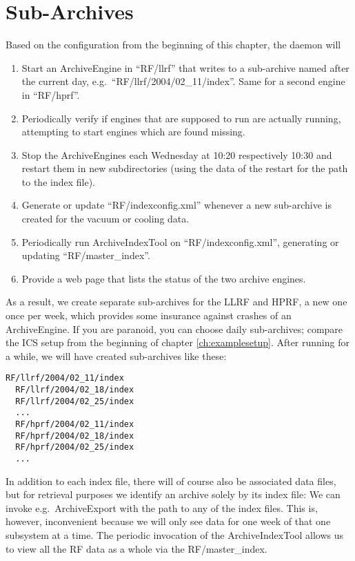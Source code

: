 \section{Sub-Archives}
Based on the configuration from the beginning of this chapter,
the daemon will 
\begin{enumerate}
\item Start an ArchiveEngine in ``RF/llrf'' that writes to
      a sub-archive named after the current day,
      e.g.\ ``RF/llrf/2004/02\_11/index''.
      Same for a second engine in ``RF/hprf''.
\item Periodically verify if engines that are supposed to run are
      actually running, attempting to start engines which are found missing.
\item Stop the ArchiveEngines each Wednesday at 10:20 respectively
      10:30 and restart them in new subdirectories
      (using the data of the restart for the path to the index file).  
\item Generate or update ``RF/indexconfig.xml'' whenever a new
      sub-archive is created for the vacuum or cooling data.
\item Periodically run ArchiveIndexTool on ``RF/indexconfig.xml'',
      generating or updating ``RF/master\_index''.
\item Provide a web page that lists the status of the two archive
      engines.
\end{enumerate}

\noindent As a result, we create separate sub-archives for the LLRF
and HPRF, a new one once per week, which provides some insurance
against crashes of an ArchiveEngine. If you are paranoid, you can
choose daily sub-archives; compare the ICS setup from the beginning of
chapter \ref{ch:examplesetup}.
After running for a while, we will have created sub-archives like these:
\begin{lstlisting}[frame=none,keywordstyle=\sffamily]
  RF/llrf/2004/02_11/index
  RF/llrf/2004/02_18/index
  RF/llrf/2004/02_25/index
  ...
  RF/hprf/2004/02_11/index
  RF/hprf/2004/02_18/index
  RF/hprf/2004/02_25/index
  ...
\end{lstlisting}
\noindent In addition to each index file, there will of course also be
associated data files, but for retrieval purposes we identify an
archive solely by its index file: We can invoke e.g.\ ArchiveExport
with the path to any of the index files. This is, however,
inconvenient because we will only see data for one week of that one
subsystem at a time. The periodic invocation of the ArchiveIndexTool
allows us to view all the RF data as a whole via the RF/master\_index.

